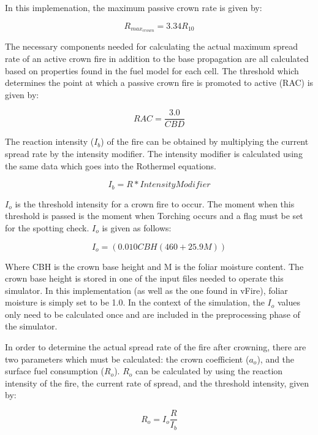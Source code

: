 In this implemenation, the maximum passive crown rate is given by: 

\begin{equation}
R_{max_{crown}} = 3.34R_{10}
\end{equation}

The necessary components needed for calculating the actual maximum spread rate of an active crown fire in addition to the base propagation are all calculated based on properties found in the fuel model for each cell. The threshold which determines the point at which a passive crown fire is promoted to active (RAC) is given by: 

\begin{equation}
RAC = \frac{3.0}{CBD}
\end{equation}

The reaction intensity ($I_b$) of the fire can be obtained by multiplying the current spread rate by the intensity modifier. The intensity modifier is calculated using the same data which goes into the Rothermel equations.

\begin{equation}
I_b = R * IntensityModifier
\end{equation}

$I_o$ is the threshold intensity for a crown fire to occur. The moment when this threshold is passed is the moment when Torching occurs and a flag must be set for the spotting check. $I_o$ is given as follows: 

\begin{equation}
I_o = (0.010CBH(460 + 25.9M))
\end{equation}

Where CBH is the crown base height and M is the foliar moisture content. The crown base height is stored in one of the input files needed to operate this simulator. In this implementation (as well as the one found in vFire), foliar moisture is simply set to be 1.0. In the context of the simulation, the $I_o$ values only need to be calculated once and are included in the preprocessing phase of the simulator. 

In order to determine the actual spread rate of the fire after crowning, there are two parameters which must be calculated: the crown coefficient ($a_o$), and the surface fuel consumption ($R_o$). $R_o$ can be calculated by using the reaction intensity of the fire, the current rate of spread, and the threshold intensity, given by: 

\begin{equation}
R_o = I_o \frac{R}{I_b}
\end{equation}

